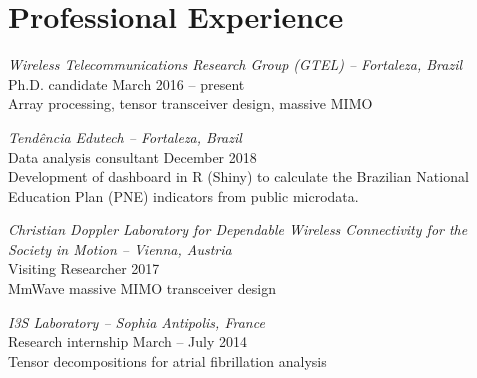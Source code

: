\section{Professional Experience}

{\sl Wireless Telecommunications Research Group (GTEL) -- Fortaleza, Brazil}\\
Ph.D. candidate \hfill March 2016 -- present \\
Array processing, tensor transceiver design, massive MIMO

{\sl Tendência Edutech -- Fortaleza, Brazil}\\
Data analysis consultant \hfill December 2018 \\
Development of dashboard in R (Shiny) to calculate the Brazilian National Education Plan (PNE) indicators from public microdata.

{\sl Christian Doppler Laboratory for Dependable Wireless Connectivity for the Society in Motion -- Vienna, Austria}\\
Visiting Researcher \hfill 2017 \\
MmWave massive MIMO transceiver design

{\sl I3S Laboratory -- Sophia Antipolis, France}\\
Research internship \hfill  March -- July 2014 \\
Tensor decompositions for atrial fibrillation analysis